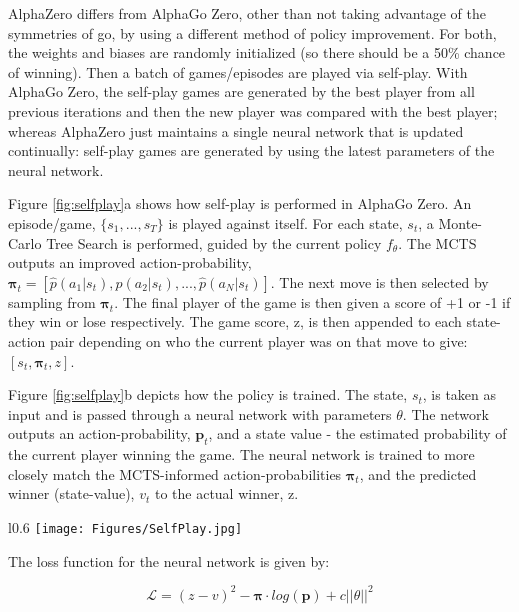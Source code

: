 \documentclass[11.7pt]{article}
\newcommand{\loss}{\mathcal{L}}
\begin{document}
AlphaZero differs from AlphaGo Zero, other than not taking advantage of the symmetries of go, by using a different method of policy improvement. For both, the weights and biases are randomly initialized (so there should be a 50\% chance of winning). Then a batch of games/episodes are played via self-play. With AlphaGo Zero, the self-play games are generated by the best player from all previous iterations and then the new player was compared with the best player; whereas AlphaZero just maintains a single neural network that is updated continually: self-play games are generated by using the latest parameters of the neural network. \cite{AlphaZero}

Figure \ref{fig:selfplay}a 
shows how self-play is performed in AlphaGo Zero. An episode/game, $\{s_1, ..., s_T\}$ is played against itself. For each state, $s_t$, a Monte-Carlo Tree Search is performed, guided by the current policy $f_\theta$. The MCTS outputs an improved action-probability, $\boldsymbol{\pi}_t = [\hat{p}(a_1|s_t), \hat{p}(a_2|s_t), ..., \hat{p}(a_N|s_t)]$. The next move is then selected by sampling from $\boldsymbol{\pi}_t$. The final player of the game is then given a score of +1 or -1 if they win or lose respectively. The game score, z, is then appended to each state-action pair depending on who the current player was on that move to give: $[s_t, \boldsymbol{\pi}_t, z]$. 

Figure \ref{fig:selfplay}b
depicts how the policy is trained. The state, $s_t$, is taken as input and is passed through a neural network with parameters $\theta$. The network outputs an action-probability, $\boldsymbol{p}_t$, and a state value - the estimated probability of the current player winning the game. The neural network is trained to more closely match the MCTS-informed action-probabilities $\boldsymbol{\pi}_t$, and the predicted winner (state-value), $v_t$ to the actual winner, z.

\begin{wrapfigure}{l}{0.6\textwidth}
   \centering
   \texttt{[image: Figures/SelfPlay.jpg]}
   \caption{A schematic showing how self-play and policy training are performed. Taken from \cite{AlphaGoZero}.}
   \label{fig:selfplay}
   \vspace{0.5cm}
\end{wrapfigure}

The loss function for the neural network is given by:

\begin{equation}
   \loss = (z - v)^2 - \boldsymbol{\pi} \cdot log(\boldsymbol{p}) + c||\theta||^2
   \label{eqn:loss}
\end{equation}
\end{document}

